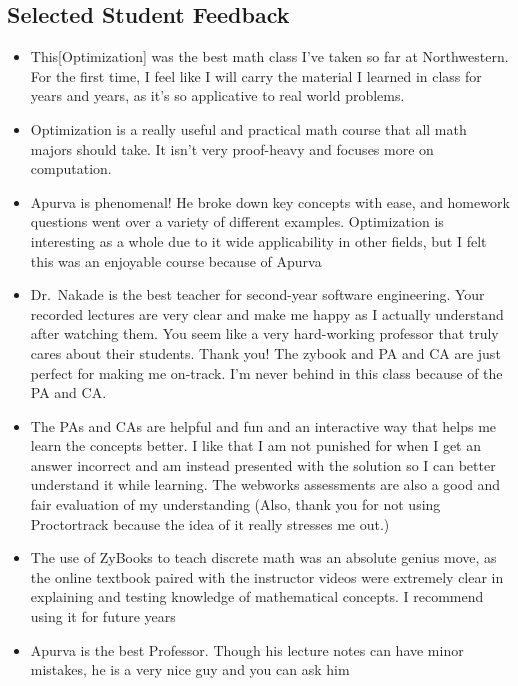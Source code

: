 \documentclass[
]{report}
\providecommand{\tightlist}{%
  \setlength{\itemsep}{0pt}\setlength{\parskip}{0pt}}
\begin{document}
\hypertarget{selected-student-feedback}{%
\subsection{Selected Student Feedback}\label{selected-student-feedback}}

\begin{itemize}
\tightlist
\item
  This{[}Optimization{]} was the best math class I've taken so far at Northwestern. For the first time, I feel like I will carry the material I learned in class
  for years and years, as it's so applicative to real world problems.
\item
  Optimization is a really useful and practical math course that all math majors should take. It isn't very proof-heavy and focuses
  more on computation.\\
\item
  Apurva is phenomenal! He broke down key concepts with ease, and homework questions went over a variety of different examples.
  Optimization is interesting as a whole due to it wide applicability in other fields, but I felt this was an enjoyable course because of
  Apurva
\item
  Dr.~Nakade is the best teacher for second-year software engineering. Your recorded lectures are very clear and make me happy as I
  actually understand after watching them. You seem like a very hard-working professor that truly cares about their students. Thank you!
  The zybook and PA and CA are just perfect for making me on-track. I'm never behind in this class because of the PA and CA.
\item
  The PAs and CAs are helpful and
  fun and an interactive way that helps me learn the concepts better. I like that I am not punished for when I get an answer incorrect and
  am instead presented with the solution so I can better understand it while learning. The webworks assessments are also a good and
  fair evaluation of my understanding
  (Also, thank you for not using Proctortrack because the idea of it really stresses me out.)
\item
  The use of ZyBooks to teach discrete math was an absolute genius move, as the online textbook paired with the instructor videos were
  extremely clear in explaining and testing knowledge of mathematical concepts. I recommend using it for future years
\item
  Apurva is the best Professor. Though his lecture notes can have minor mistakes, he is a very nice guy and you can ask him

\end{itemize}
\end{document}
